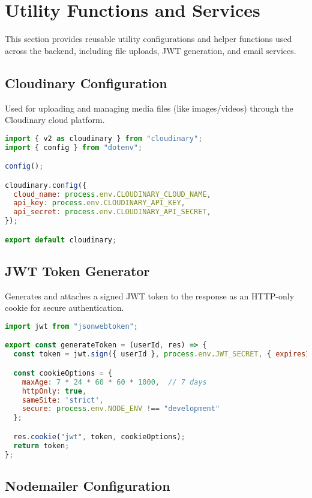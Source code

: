 \documentclass[12pt,a4paper]{report}
\begin{document}
\section{Utility Functions and Services}

This section provides reusable utility configurations and helper functions used across the backend, including file uploads, JWT generation, and email services.

\subsection{Cloudinary Configuration}

Used for uploading and managing media files (like images/videos) through the Cloudinary cloud platform.

\begin{lstlisting}[language=JavaScript, caption={cloudinary.js}, label={lst:cloudinary}]
import { v2 as cloudinary } from "cloudinary";
import { config } from "dotenv";

config();

cloudinary.config({
  cloud_name: process.env.CLOUDINARY_CLOUD_NAME,
  api_key: process.env.CLOUDINARY_API_KEY,
  api_secret: process.env.CLOUDINARY_API_SECRET,
});

export default cloudinary;
\end{lstlisting}

\subsection{JWT Token Generator}

Generates and attaches a signed JWT token to the response as an HTTP-only cookie for secure authentication.

\begin{lstlisting}[language=JavaScript, caption={generateToken.js}, label={lst:generatetoken}]
import jwt from "jsonwebtoken";

export const generateToken = (userId, res) => {
  const token = jwt.sign({ userId }, process.env.JWT_SECRET, { expiresIn: '7d' });

  const cookieOptions = {
    maxAge: 7 * 24 * 60 * 60 * 1000,  // 7 days
    httpOnly: true,
    sameSite: 'strict',
    secure: process.env.NODE_ENV !== "development"
  };

  res.cookie("jwt", token, cookieOptions);
  return token;
};
\end{lstlisting}

\subsection{Nodemailer Configuration}
\end{document}
